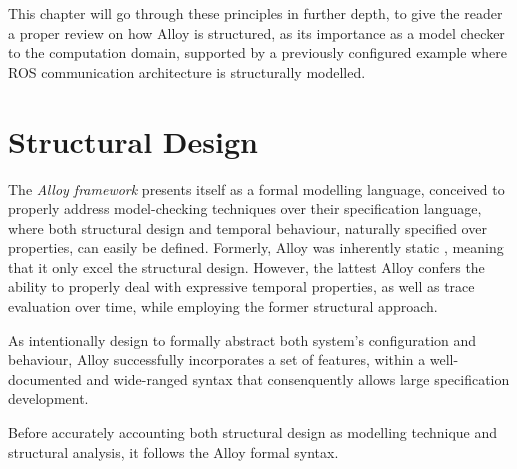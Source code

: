 This chapter will go through these principles in further depth, to give the reader a proper review on how Alloy is structured, as its importance as a model checker to the computation domain, supported by a previously configured example where ROS communication architecture is structurally modelled.

\section{Structural Design}

The \textit{Alloy framework} presents itself as a formal modelling language, conceived to properly address model-checking techniques over their specification language, where both structural design and temporal behaviour, naturally specified over properties, can easily be defined. Formerly, Alloy was inherently static \cite{lwspecification}, meaning that it only excel the structural design. However, the lattest Alloy confers the ability to properly deal with expressive temporal properties, as well as trace evaluation over time, while employing the former structural approach. 

As intentionally design to formally abstract both system's configuration and behaviour, Alloy successfully incorporates a set of features, within a well-documented and wide-ranged syntax that consenquently allows large specification development. \cite{carvalho2020analysis} 

Before accurately accounting both structural design as modelling technique and structural analysis, it follows the Alloy formal syntax.

